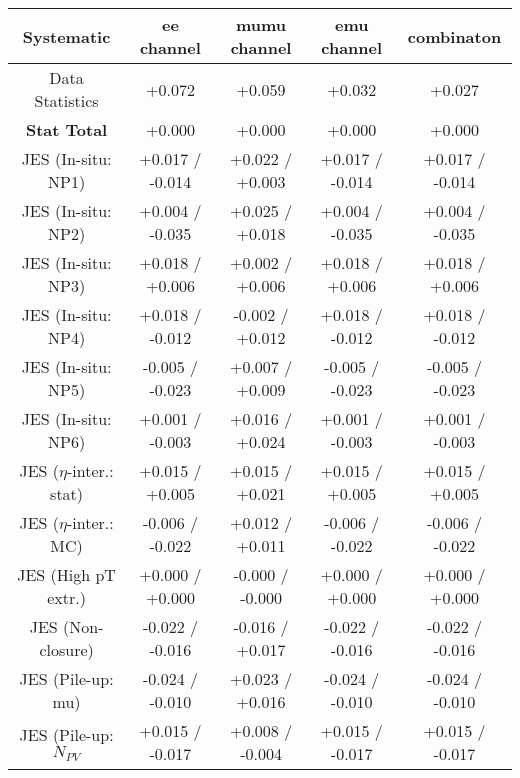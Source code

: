 \begin{table}[htbp]
\scriptsize
  \begin{center} 
  \begin{tabular}{|c|c|c|c|c|}
  \hline
Systematic                            &  ee channel&  mumu channel&  emu channel&  combinaton\\
  \hline
Data Statistics                       &+0.072              & +0.059              & +0.032              & +0.027             \\
\hline
\textbf{Stat Total}                   &+0.000              & +0.000              & +0.000              & +0.000             \\
\hline
JES (In-situ: NP1)                    &+0.017   / -0.014   & +0.022   / +0.003   & +0.017   / -0.014   & +0.017   / -0.014  \\
JES (In-situ: NP2)                    &+0.004   / -0.035   & +0.025   / +0.018   & +0.004   / -0.035   & +0.004   / -0.035  \\
JES (In-situ: NP3)                    &+0.018   / +0.006   & +0.002   / +0.006   & +0.018   / +0.006   & +0.018   / +0.006  \\
JES (In-situ: NP4)                    &+0.018   / -0.012   & -0.002   / +0.012   & +0.018   / -0.012   & +0.018   / -0.012  \\
JES (In-situ: NP5)                    &-0.005   / -0.023   & +0.007   / +0.009   & -0.005   / -0.023   & -0.005   / -0.023  \\
JES (In-situ: NP6)                    &+0.001   / -0.003   & +0.016   / +0.024   & +0.001   / -0.003   & +0.001   / -0.003  \\
JES ($\eta$-inter.: stat)               &+0.015   / +0.005   & +0.015   / +0.021   & +0.015   / +0.005   & +0.015   / +0.005  \\
JES ($\eta$-inter.: MC)                 &-0.006   / -0.022   & +0.012   / +0.011   & -0.006   / -0.022   & -0.006   / -0.022  \\
JES (High pT extr.)                  &+0.000   / +0.000   & -0.000   / -0.000   & +0.000   / +0.000   & +0.000   / +0.000  \\
JES (Non-closure)                     &-0.022   / -0.016   & -0.016   / +0.017   & -0.022   / -0.016   & -0.022   / -0.016  \\
JES (Pile-up: mu)                     &-0.024   / -0.010   & +0.023   / +0.016   & -0.024   / -0.010   & -0.024   / -0.010  \\
JES (Pile-up: $N_{PV}$                  &+0.015   / -0.017   & +0.008   / -0.004   & +0.015   / -0.017   & +0.015   / -0.017  \\

\end{tabular}
\end{center}
\end{table}
